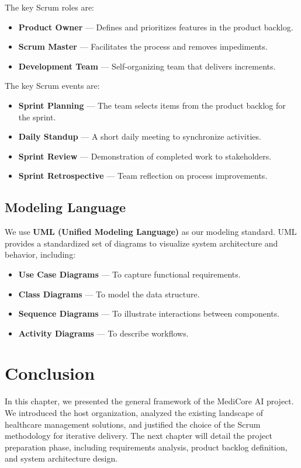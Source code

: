 \documentclass[12pt,a4paper,oneside]{report}
\begin{document}
The key Scrum roles are:
\begin{itemize}
    \item \textbf{Product Owner} — Defines and prioritizes features in the product backlog.
    \item \textbf{Scrum Master} — Facilitates the process and removes impediments.
    \item \textbf{Development Team} — Self-organizing team that delivers increments.
\end{itemize}

The key Scrum events are:
\begin{itemize}
    \item \textbf{Sprint Planning} — The team selects items from the product backlog for the sprint.
    \item \textbf{Daily Standup} — A short daily meeting to synchronize activities.
    \item \textbf{Sprint Review} — Demonstration of completed work to stakeholders.
    \item \textbf{Sprint Retrospective} — Team reflection on process improvements.
\end{itemize}

\subsection{Modeling Language}
We use \textbf{UML (Unified Modeling Language)} as our modeling standard. UML provides a standardized set of diagrams to visualize system architecture and behavior, including:

\begin{itemize}
    \item \textbf{Use Case Diagrams} — To capture functional requirements.
    \item \textbf{Class Diagrams} — To model the data structure.
    \item \textbf{Sequence Diagrams} — To illustrate interactions between components.
    \item \textbf{Activity Diagrams} — To describe workflows.
\end{itemize}

\section{Conclusion}
In this chapter, we presented the general framework of the MediCore AI project. We introduced the host organization, analyzed the existing landscape of healthcare management solutions, and justified the choice of the Scrum methodology for iterative delivery. The next chapter will detail the project preparation phase, including requirements analysis, product backlog definition, and system architecture design.
\end{document}
